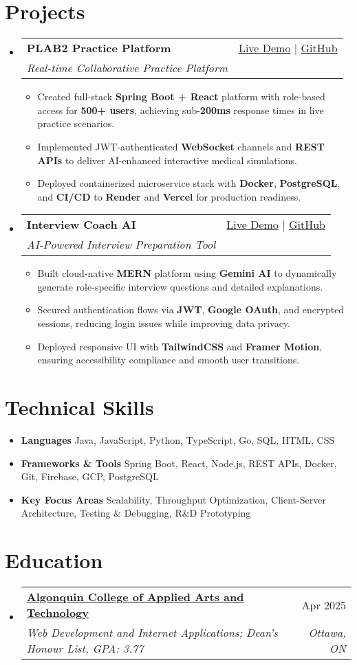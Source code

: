 \documentclass[letterpaper,11pt]{article}
\makeatletter
\newcommand{\resumeItem}[1]{\item\small{#1 \vspace{-2pt}}}
\newcommand{\resumeSubheading}[4]{
  \vspace{-1pt}\item
    \begin{tabular*}{0.97\textwidth}[t]{l@{\extracolsep{\fill}}r}
      \textbf{#1} & #2 \\
      \textit{\small#3} & \textit{\small #4} \\
    \end{tabular*}\vspace{-5pt}
}
\newcommand{\resumeSubHeadingListStart}{\begin{itemize}[leftmargin=*]}
\newcommand{\resumeSubHeadingListEnd}{\end{itemize}}
\newcommand{\resumeItemListStart}{\begin{itemize}}
\newcommand{\resumeItemListEnd}{\end{itemize}\vspace{-5pt}}
\makeatother
\begin{document}
\section{Projects}
  \resumeSubHeadingListStart
    \resumeSubheading
      {\textbf{PLAB2 Practice Platform}}{\href{https://plab2practice.com}{Live Demo} | \href{https://github.com/altansaid/plab2projectnew}{GitHub}}
      {Real-time Collaborative Practice Platform}{}
      \resumeItemListStart
        \resumeItem{Created full-stack \textbf{Spring Boot + React} platform with role-based access for \textbf{500+ users}, achieving sub-\textbf{200ms} response times in live practice scenarios.}
        \resumeItem{Implemented JWT-authenticated \textbf{WebSocket} channels and \textbf{REST APIs} to deliver AI-enhanced interactive medical simulations.}
        \resumeItem{Deployed containerized microservice stack with \textbf{Docker}, \textbf{PostgreSQL}, and \textbf{CI/CD} to \textbf{Render} and \textbf{Vercel} for production readiness.}
      \resumeItemListEnd

    \resumeSubheading
      {\textbf{Interview Coach AI}}{\href{https://interviewcoach-ai.vercel.app/}{Live Demo} | \href{https://github.com/altansaid/interviewcoach-ai}{GitHub}}
      {AI-Powered Interview Preparation Tool}{}
      \resumeItemListStart
        \resumeItem{Built cloud-native \textbf{MERN} platform using \textbf{Gemini AI} to dynamically generate role-specific interview questions and detailed explanations.}
        \resumeItem{Secured authentication flows via \textbf{JWT}, \textbf{Google OAuth}, and encrypted sessions, reducing login issues while improving data privacy.}
        \resumeItem{Deployed responsive UI with \textbf{TailwindCSS} and \textbf{Framer Motion}, ensuring accessibility compliance and smooth user transitions.}
      \resumeItemListEnd
  \resumeSubHeadingListEnd

\section{Technical Skills}
  \resumeItemListStart
    \resumeItem{\textbf{Languages}}{Java, JavaScript, Python, TypeScript, Go, SQL, HTML, CSS}
    \resumeItem{\textbf{Frameworks \& Tools}}{Spring Boot, React, Node.js, REST APIs, Docker, Git, Firebase, GCP, PostgreSQL}
    \resumeItem{\textbf{Key Focus Areas}}{Scalability, Throughput Optimization, Client-Server Architecture, Testing \& Debugging, R\&D Prototyping}
  \resumeItemListEnd

\section{Education}
  \resumeSubHeadingListStart
    \resumeSubheading
      {\href{https://www.algonquincollege.com/sat/program/web-development-internet-applications/}{Algonquin College of Applied Arts and Technology}}{Apr 2025}
      {Web Development and Internet Applications; Dean's Honour List, GPA: 3.77}{Ottawa, ON}
  \resumeSubHeadingListEnd
\end{document}
